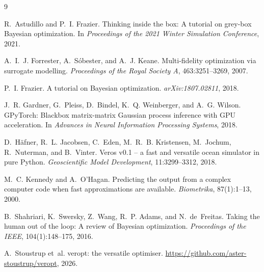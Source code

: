 \documentclass[11pt,a4paper]{article}
\newcommand{\veropt}{\textsf{veropt}}
\begin{document}
\begin{thebibliography}{9}

R.~Astudillo and P.~I. Frazier.
\newblock Thinking inside the box: A tutorial on grey-box Bayesian
  optimization.
\newblock In \emph{Proceedings of the 2021 Winter Simulation Conference}, 2021.

A.~I.~J. Forrester, A.~S\'obester, and A.~J. Keane.
\newblock Multi-fidelity optimization via surrogate modelling.
\newblock \emph{Proceedings of the Royal Society A}, 463:3251--3269, 2007.

P.~I. Frazier.
\newblock A tutorial on Bayesian optimization.
\newblock \emph{arXiv:1807.02811}, 2018.

J.~R. Gardner, G.~Pleiss, D.~Bindel, K.~Q. Weinberger, and A.~G. Wilson.
\newblock GPyTorch: Blackbox matrix-matrix Gaussian process inference with GPU
  acceleration.
\newblock In \emph{Advances in Neural Information Processing Systems}, 2018.

D.~H{\"a}fner, R.~L. Jacobsen, C.~Eden, M.~R.~B. Kristensen, M.~Jochum,
  R.~Nuterman, and B.~Vinter.
\newblock Veros v0.1 -- a fast and versatile ocean simulator in pure Python.
\newblock \emph{Geoscientific Model Development}, 11:3299--3312, 2018.

M.~C. Kennedy and A.~O'Hagan.
\newblock Predicting the output from a complex computer code when fast
  approximations are available.
\newblock \emph{Biometrika}, 87(1):1--13, 2000.

B.~Shahriari, K.~Swersky, Z.~Wang, R.~P. Adams, and N.~de~Freitas.
\newblock Taking the human out of the loop: A review of Bayesian optimization.
\newblock \emph{Proceedings of the IEEE}, 104(1):148--175, 2016.

A.~Stoustrup et~al.
\newblock \veropt{}: the versatile optimiser.
\newblock \url{https://github.com/aster-stoustrup/veropt}, 2026.

\end{thebibliography}
\end{document}
